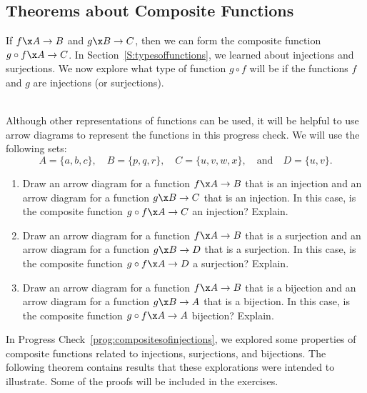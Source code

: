 \subsection*{Theorems about Composite Functions}
If $f \x A \to B$ and $g \x B \to C$, then we can form the composite function $g \circ f \x A \to C$.  In Section~\ref{S:typesoffunctions}, we learned about injections and surjections.  We now explore what type of function $g \circ f$ will be if the functions $f$ and $g$ are injections (or surjections).  

\begin{prog} \label{prog:compositesofinjections} \hfill \\
Although other representations of functions can be used, it will be helpful to use arrow diagrams to represent the functions in this progress check.  We will use the following sets:
\[
A = \{ a, b, c \}, \quad B = \{p, q, r\}, \quad C = \{u, v, w, x \}, \quad \text{and} \quad D = \{u, v \}.
\]
\begin{enumerate}
  \item Draw an arrow diagram for a function $f \x A \to B$ that is an injection and an arrow diagram for a function $g \x B \to C$ that is an injection.  In this case, is the composite function 
$g \circ f \x A \to C$ an injection?  Explain.

    \item Draw an arrow diagram for a function $f \x A \to B$ that is a surjection and an arrow diagram for a function $g \x B \to D$ that is a surjection.  In this case, is the composite function 
$g \circ f \x A \to D$ a surjection?  Explain.

  \item Draw an arrow diagram for a function $f \x A \to B$ that is a bijection and an arrow diagram for a function $g \x B \to A$ that is a bijection.  In this case, is the composite function 
$g \circ f \x A \to A$ bijection?  Explain.
\end{enumerate}
\end{prog}
\hbreak

%
In Progress Check~\ref{prog:compositesofinjections}, we explored some properties of composite functions related to injections, surjections, and bijections.  The following theorem contains results that these explorations were intended to illustrate.  Some of the proofs will be included in the exercises.


